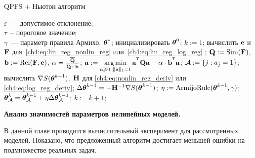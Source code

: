 \documentclass[11pt, a5paper]{dissert}
\begin{document}
\begin{algorithm}[ht]
	\caption{QPFS + Ньютон алгоритм}
	\label{ch4:alg:QPFSNewton}
	\begin{algorithmic}
		\REQUIRE $\varepsilon$~--- допустимое отклонение;\\
		\hspace{1.07cm}$\tau$~-- пороговое значение;\\
		\hspace{1.07cm}$\gamma$~--- параметр правила Армихо.
		\ENSURE $\boldsymbol{\theta}^*$;
		\STATE  инициализировать $\boldsymbol{\theta}^0$;
		\STATE $k := 1$;
		\REPEAT
		\STATE вычислить $\mathbf{e}$ и $\mathbf{F}$ для~\eqref{ch4:eq:lin_reg_nonlin_reg} или~\eqref{ch4:eq:lin_reg_log_reg} ;
		\vspace{0.1cm}
		\STATE $\mathbf{Q} := \text{Sim} (\mathbf{F})$, $\mathbf{b} := \text{Rel}(\mathbf{F}, \mathbf{e})$, $\alpha = \frac{\overline{\mathbf{Q}}}{\overline{\mathbf{Q}} + \overline{\mathbf{b}}}$;
		\vspace{0.1cm}
		\STATE $\ba := \argmin_{\ba \geq 0, \, \|\ba\|_1=1}\ba^{\T} \bQ \ba - \alpha \cdot \mathbf{b}^{\T} \ba$;
		\vspace{0.1cm}
		\STATE $\mathcal{A} := \{j: a_j = 1\}$;
		\vspace{0.1cm}
		\STATE вычислить $\nabla S(\boldsymbol{\theta}^{k-1})$, $\mathbf{H}$ для \eqref{ch4:eq:nonlin_reg_deriv} или \eqref{ch4:eq:log_reg_deriv};
		\vspace{0.1cm}
		\STATE $\Delta \boldsymbol{\theta}^{k-1} = - \mathbf{H}^{-1} \nabla S(\boldsymbol{\theta}^{k-1})$;
		\vspace{0.1cm}
		\STATE $\eta := \text{ArmijoRule}(\boldsymbol{\theta}^{k-1}, \gamma)$;
		\vspace{0.1cm}
		\STATE $\boldsymbol{\theta}_{\mathcal{A}}^k = \boldsymbol{\theta}_{\mathcal{A}}^{k - 1} + \eta \Delta \boldsymbol{\theta}_{\mathcal{A}}^{k - 1}$;
		\vspace{0.1cm}
		\STATE $k := k + 1$;
		\vspace{0.1cm}
	\end{algorithmic}
\end{algorithm}

\textbf{Анализ значимостей параметров нелинейных моделей.}
\label{sec:ch4:newton_qpfs_exp}

В данной главе приводится вычислительный эксперимент для рассмотренных моделей. 
Показано, что предложенный алгоритм достигает меньшей ошибки на подмножестве реальных задач.
\end{document}
